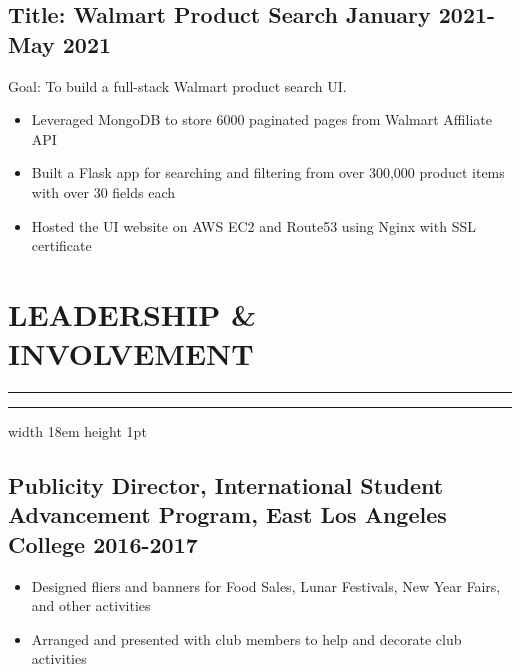 \documentclass[11pt]{article}
\newcommand{\divider}[1]{%
	\vskip-2pt %
	{%
		\color{black}%
		\hrule%
	}%
	\nointerlineskip%
	\noindent%
	{%
		\color{black}%
		\hrule width #1 height 1pt%
	}%
	\vskip5pt%
}
\begin{document}
\subsection*{Title: Walmart Product Search \hfill {\normalfont January 2021-May 2021}}
\noindent
\href{https://github.com/Anthonyive/DSCI-551-Project.git}{} Goal: To build a full-stack Walmart product search UI.
\begin{itemize}
    \setlength\itemsep{-1pt}
    \item Leveraged MongoDB to store 6000 paginated pages from Walmart 
        Affiliate API
    \item Built a Flask app for searching and filtering from over 300,000 
        product items with over 30 fields each
    \item Hosted the UI website on AWS EC2 and Route53 using Nginx with SSL 
        certificate
\end{itemize}


\section*{LEADERSHIP \& INVOLVEMENT}
\divider{18em}
\subsection*{Publicity Director{\normalfont, International Student Advancement Program, East Los Angeles College \hfill	2016-2017}}
\begin{itemize}
    \setlength\itemsep{-1pt}
    \item Designed fliers and banners for Food Sales, Lunar Festivals, 
        New Year Fairs, and other activities
    \item Arranged and presented with club members to help and decorate 
        club activities
\end{itemize}
\end{document}
